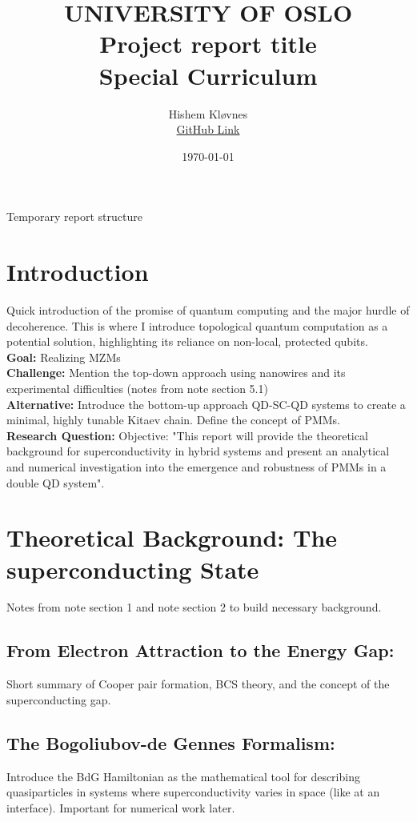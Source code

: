 \documentclass[11pt, letterpaper, titlepage]{article}
\title{
 \textbf{\LARGE UNIVERSITY OF OSLO} \\
\vspace{37mm}
\textbf{\Large Project report title}\\
\vspace{7mm}
\Large Special Curriculum \\
\vspace{25mm}
}
\author{\Large Hishem Kløvnes \\ \textcolor{blue}{\href{https://github.com/hishemok/Special_curriculum}{GitHub Link} }}
\date{\Large \today} %
\begin{document}
\maketitle
\newpage



\Large Temporary report structure
\section{Introduction}
Quick introduction of the promise of quantum computing and the major hurdle of decoherence. This is where I introduce topological quantum computation as a potential solution, highlighting its reliance on non-local, protected qubits. 
\\
\textbf{Goal:} Realizing MZMs\\
\textbf{Challenge:} Mention the top-down approach using nanowires and its experimental difficulties (notes from note section 5.1)\\
\textbf{Alternative:} Introduce the bottom-up approach QD-SC-QD systems to create a minimal, highly tunable Kitaev chain. Define the concept of PMMs. \\
\textbf{Research Question:} Objective: "This report will provide the theoretical background for superconductivity in hybrid systems and present an analytical and numerical investigation into the emergence and robustness of PMMs in a double QD system". \\

\section{Theoretical Background: The superconducting State}
Notes from note section 1 and note section 2 to build necessary background.\\
\subsection{From Electron Attraction to the Energy Gap:} Short summary of Cooper pair formation, BCS theory, and the concept of the superconducting gap.\\
\subsection{The Bogoliubov-de Gennes Formalism:} Introduce the BdG Hamiltonian as the  mathematical tool for describing quasiparticles in systems where superconductivity varies in space (like at an interface). Important for numerical work later.\\
\end{document}
